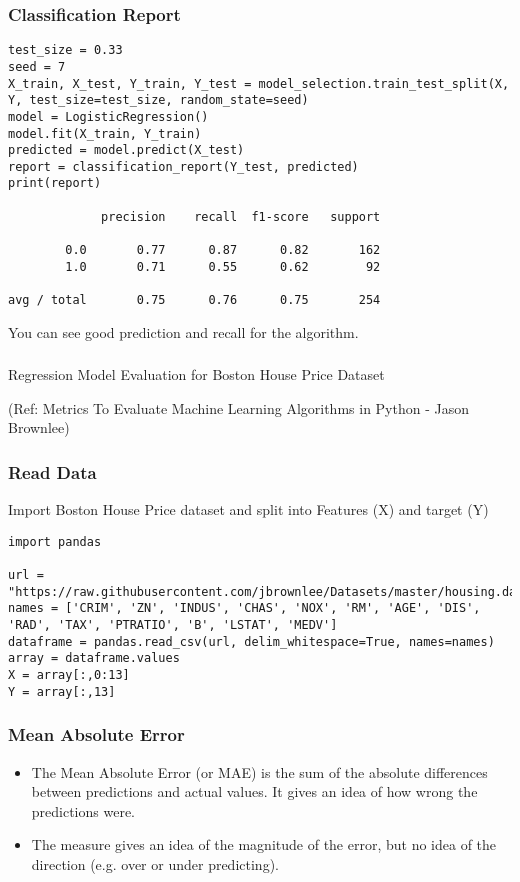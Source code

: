 \begin{frame}[fragile]\frametitle{Classification Report}
\begin{lstlisting}
test_size = 0.33
seed = 7
X_train, X_test, Y_train, Y_test = model_selection.train_test_split(X, Y, test_size=test_size, random_state=seed)
model = LogisticRegression()
model.fit(X_train, Y_train)
predicted = model.predict(X_test)
report = classification_report(Y_test, predicted)
print(report)

             precision    recall  f1-score   support

        0.0       0.77      0.87      0.82       162
        1.0       0.71      0.55      0.62        92

avg / total       0.75      0.76      0.75       254
\end{lstlisting}

You can see good prediction and recall for the algorithm.
\end{frame}

\begin{frame}[fragile]\frametitle{}
\begin{center}
{\Large Regression Model Evaluation for Boston House Price Dataset}

{\tiny (Ref: Metrics To Evaluate Machine Learning Algorithms in Python - Jason Brownlee)}
\end{center}
\end{frame}

\begin{frame}[fragile]\frametitle{Read Data}
Import Boston House Price dataset and split into Features (X) and target (Y)
\begin{lstlisting}
import pandas

url = "https://raw.githubusercontent.com/jbrownlee/Datasets/master/housing.data"
names = ['CRIM', 'ZN', 'INDUS', 'CHAS', 'NOX', 'RM', 'AGE', 'DIS', 'RAD', 'TAX', 'PTRATIO', 'B', 'LSTAT', 'MEDV']
dataframe = pandas.read_csv(url, delim_whitespace=True, names=names)
array = dataframe.values
X = array[:,0:13]
Y = array[:,13]
\end{lstlisting}
\end{frame}

\begin{frame}[fragile]\frametitle{Mean Absolute Error}

	\begin{itemize}
	\item The Mean Absolute Error (or MAE) is the sum of the absolute differences between predictions and actual values. It gives an idea of how wrong the predictions were.
	\item The measure gives an idea of the magnitude of the error, but no idea of the direction (e.g. over or under predicting).
	\end{itemize}

\end{frame}

